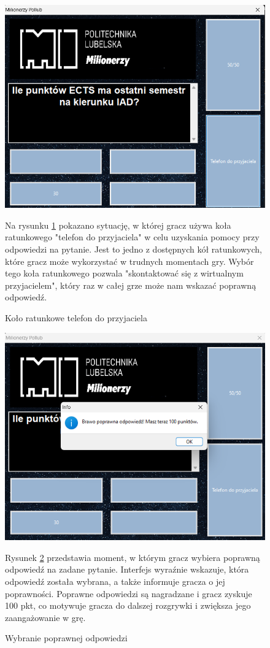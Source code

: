 \documentclass[]{article}
\begin{document}
\begin{figure}[!h]
	\includegraphics[width=\linewidth]{3.png}
	\caption{Koło ratunkowe telefon do przyjaciela}
	\label{rys:3}
	Na rysunku \ref{rys:3} pokazano sytuację, w której gracz używa koła ratunkowego "telefon do przyjaciela" w celu uzyskania pomocy przy odpowiedzi na pytanie. Jest to jedno z dostępnych kół ratunkowych, które gracz może wykorzystać w trudnych momentach gry. Wybór tego koła ratunkowego pozwala "skontaktować się z wirtualnym przyjacielem", który raz w całej grze może nam wskazać poprawną odpowiedź.
\end{figure}

\begin{figure}[!h]
	\includegraphics[width=\linewidth]{4.png}
	\caption{Wybranie poprawnej odpowiedzi}
	\label{rys:4}
	Rysunek \ref{rys:4} przedstawia moment, w którym gracz wybiera poprawną odpowiedź na zadane pytanie. Interfejs wyraźnie wskazuje, która odpowiedź została wybrana, a także informuje gracza o jej poprawności. Poprawne odpowiedzi są nagradzane i gracz zyskuje 100 pkt, co motywuje gracza do dalszej rozgrywki i zwiększa jego zaangażowanie w grę.
\end{figure}
\end{document}
